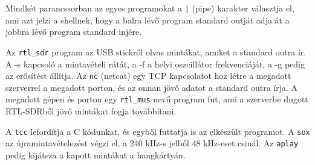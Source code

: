 \documentclass[12pt,a4paper]{article}
\begin{document}
Mindkét parancssorban az egyes programokat a \texttt{|} (pipe) karakter választja el, ami azt jelzi a shellnek,
hogy a balra lévő program standard outját adja át a jobbra lévő program standard injére.

Az \texttt{rtl\_sdr} program az USB stickről olvas mintákat, amiket a standard outra ír. A -s kapcsoló a mintavételi rátát, a -f a helyi oszcillátor frekvenciáját, a -g pedig az erősítést állítja.
Az \texttt{nc} (netcat) egy TCP kapcsolatot hoz létre a megadott szerverrel a megadott porton, és az onnan jövő adatot a standard outra írja.
A megadott gépen és porton egy \texttt{rtl\_mus} nevű program fut, ami a szerverbe dugott RTL-SDRből jövő mintákat fogja továbbítani.

A \texttt{tcc} lefordítja a C kódunkat, és egyből futtatja is az elkészült programot.
A \texttt{sox} az újramintavételezést végzi el, a 240 kHz-s jelből 48 kHz-eset csinál.
Az \texttt{aplay} pedig kijátsza a kapott mintákat a hangkártyán.
\end{document}
